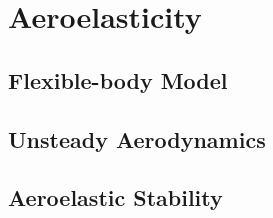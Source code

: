 
\chapter{Aeroelasticity}

\section{Flexible-body Model}
\section{Unsteady Aerodynamics}
\section{Aeroelastic Stability}
